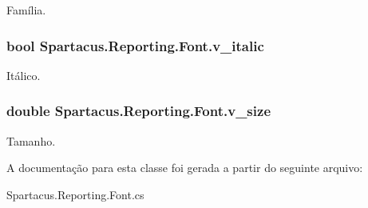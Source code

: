Família. 

\hypertarget{classSpartacus_1_1Reporting_1_1Font_aa87e964d534cd4225c05c70e83586dcf}{
\subsubsection[{v\+\_\+italic}]{\setlength{\rightskip}{0pt plus 5cm}bool Spartacus.\+Reporting.\+Font.\+v\+\_\+italic}}\label{classSpartacus_1_1Reporting_1_1Font_aa87e964d534cd4225c05c70e83586dcf}


Itálico. 

\hypertarget{classSpartacus_1_1Reporting_1_1Font_a74edcb46e5f2bfaf11251157d2d9551f}{
\subsubsection[{v\+\_\+size}]{\setlength{\rightskip}{0pt plus 5cm}double Spartacus.\+Reporting.\+Font.\+v\+\_\+size}}\label{classSpartacus_1_1Reporting_1_1Font_a74edcb46e5f2bfaf11251157d2d9551f}


Tamanho. 



A documentação para esta classe foi gerada a partir do seguinte arquivo\+:\begin{DoxyCompactItemize}
\item 
Spartacus.\+Reporting.\+Font.\+cs\end{DoxyCompactItemize}
